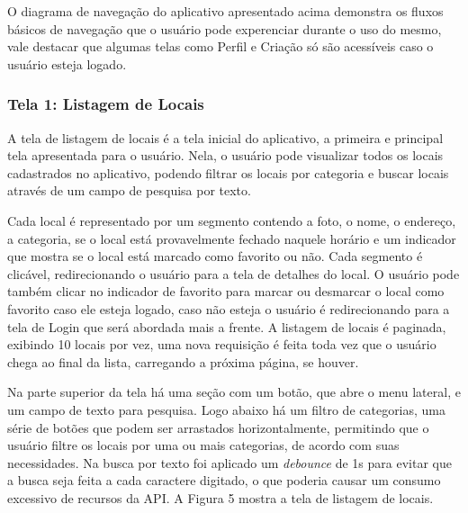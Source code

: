     O diagrama de navegação do aplicativo apresentado acima demonstra os fluxos básicos de navegação que o usuário pode experenciar
    durante o uso do mesmo, vale destacar que algumas telas como Perfil e Criação só são acessíveis caso o usuário esteja logado.

    \FloatBarrier

\subsubsection{Tela 1: Listagem de Locais}

    A tela de listagem de locais é a tela inicial do aplicativo, a primeira e principal tela apresentada para o usuário. Nela, o usuário pode visualizar todos os locais cadastrados no aplicativo, podendo filtrar os locais por categoria e buscar locais através de um campo de pesquisa por texto. 
    
    Cada local é representado por um segmento contendo a foto, o nome, o endereço, a categoria, se o local está provavelmente fechado naquele horário e um indicador que mostra se o local está marcado como favorito ou não. Cada segmento é clicável, redirecionando o usuário para a tela de detalhes do local. O usuário pode também clicar no indicador de favorito para marcar ou desmarcar o local como favorito caso ele esteja logado, caso não esteja o usuário é redirecionando para a tela de Login que será abordada mais a frente. A listagem de locais é paginada, exibindo 10 locais por vez, uma nova requisição é feita toda vez que o usuário chega ao final da lista, carregando a próxima página, se houver.

    Na parte superior da tela há uma seção com um botão, que abre o menu lateral, e um campo de texto para pesquisa. Logo abaixo há um filtro de categorias, uma série de botões que podem ser arrastados horizontalmente, permitindo que o usuário filtre os locais por uma ou mais categorias, de acordo com suas necessidades. Na busca por texto foi aplicado um \textit{debounce} de 1s para evitar que a busca seja feita a cada caractere digitado, o que poderia causar um consumo excessivo de recursos da API. A Figura 5 mostra a tela de listagem de locais.


